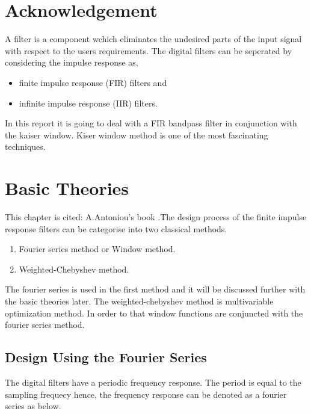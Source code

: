 \documentclass[twoside,12pt,times,onecolumn,a4paper]{report}
\begin{document}
\chapter{Acknowledgement}
\hspace{4em}A filter is a component wchich eliminates the undesired parts of the input signal with respect to the users requirements. The digital filters can be seperated by considering the impulse response as\cite{A.Antoniou},
\begin{itemize}
  \item finite impulse response (FIR) filters and 
  \item infinite impulse response (IIR) filters.
\end{itemize}
In this report it is going to deal with a FIR bandpass filter in conjunction with the kaiser window. Kiser window method is one of the most fascinating techniques.  
\pagebreak

\tableofcontents
\listoffigures
\listoftables


\chapter{Basic Theories}
\hspace{4em}This chapter is cited: A.Antoniou's book \cite{A.Antoniou}.The design process of the finite impulse response filters can be categorise into two classical methods.
\begin{enumerate}
  \item  Fourier series method or Window method.
  \item Weighted-Chebyshev method.
\end{enumerate}
The fourier series is used in the first method and it will be discussed further with the basic theories later. The weighted-chebyshev method is multivariable optimization method. In order to that window functions are conjuncted with the fourier series method.

\section{Design Using the Fourier Series}

\hspace{4em}The digital filters have a periodic frequency response. The period is equal to the sampling frequecy hence, the frequency response can be denoted as a fourier series as below.

\end{document}
